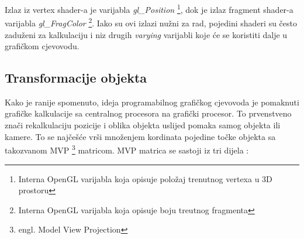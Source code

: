 Izlaz iz vertex shader-a je varijabla \emph{gl\_Position} \footnote{Interna OpenGL varijabla koja opisuje položaj trenutnog vertexa u 3D prostoru}, dok je izlaz fragment shader-a varijabla \emph{gl\_FragColor} \footnote{Interna OpenGL varijabla koja opisuje boju treutnog fragmenta}. Iako su ovi izlazi nužni za rad, pojedini shaderi su često zaduženi za kalkulaciju i niz drugih \emph{varying} varijabli koje će se koristiti dalje u grafičkom cjevovodu.

\subsection{Transformacije objekta}

Kako je ranije spomenuto, ideja programabilnog grafičkog cjevovoda je pomaknuti grafičke kalkulacije sa centralnog procesora na grafički procesor. To prvenstveno znači rekalkulaciju pozicije i oblika objekta uslijed pomaka samog objekta ili kamere. To se najčešće vrši množenjem kordinata pojedine točke objekta sa takozvanom MVP \footnote{engl. Model View Projection} matricom. MVP matrica se sastoji iz tri dijela \cite{opengl-es-mvp}:

